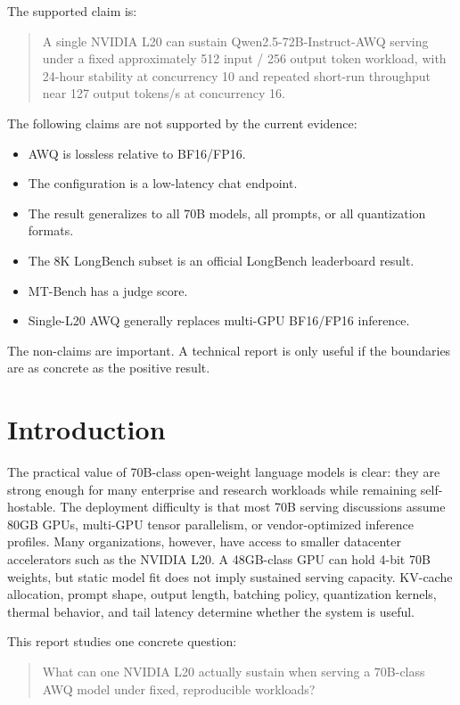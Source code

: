 \documentclass[11pt]{article}
\newcommand{\qwenawq}{Qwen2.5\nobreakdash-72B\nobreakdash-Instruct\nobreakdash-AWQ}
\begin{document}
The supported claim is:

\begin{quote}
A single NVIDIA L20 can sustain \qwenawq{} serving under a fixed
approximately 512 input / 256 output token workload, with 24-hour stability at
concurrency 10 and repeated short-run throughput near 127 output tokens/s at
concurrency 16.
\end{quote}

The following claims are not supported by the current evidence:

\begin{itemize}
  \item AWQ is lossless relative to BF16/FP16.
  \item The configuration is a low-latency chat endpoint.
  \item The result generalizes to all 70B models, all prompts, or all
        quantization formats.
  \item The 8K LongBench subset is an official LongBench leaderboard result.
  \item MT-Bench has a judge score.
  \item Single-L20 AWQ generally replaces multi-GPU BF16/FP16 inference.
\end{itemize}

The non-claims are important. A technical report is only useful if the
boundaries are as concrete as the positive result.

\section{Introduction}

The practical value of 70B-class open-weight language models is clear: they are
strong enough for many enterprise and research workloads while remaining
self-hostable. The deployment difficulty is that most 70B serving discussions
assume 80GB GPUs, multi-GPU tensor parallelism, or vendor-optimized inference
profiles. Many organizations, however, have access to smaller datacenter
accelerators such as the NVIDIA L20. A 48GB-class GPU can hold 4-bit 70B weights,
but static model fit does not imply sustained serving capacity. KV-cache
allocation, prompt shape, output length, batching policy, quantization kernels,
thermal behavior, and tail latency determine whether the system is useful.

This report studies one concrete question:

\begin{quote}
What can one NVIDIA L20 actually sustain when serving a 70B-class AWQ model
under fixed, reproducible workloads?
\end{quote}
\end{document}

